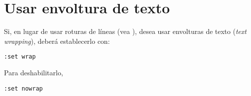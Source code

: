 \section{Usar envoltura de texto}\label{sec:vim-wrap}
Si, en lugar de usar roturas de líneas (vea ), desea usar envolturas de texto
(\foreignlanguage{english}{\emph{text wrapping}}), deberá establecerlo con:

\begin{lstlisting}[gobble=2,style=bashinteract,escapechar=!]
  :set wrap
\end{lstlisting}

\noindent Para deshabilitarlo,

\begin{lstlisting}[gobble=2,style=bashinteract,escapechar=!]
  :set nowrap
\end{lstlisting}
